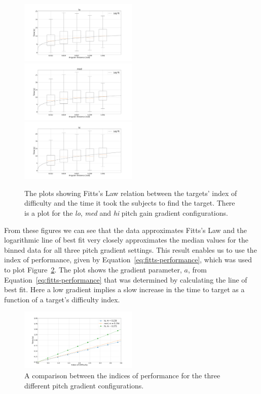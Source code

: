 \documentclass[format=sigconf, review=true, screen=true, anonymous=true]{acmart}
\begin{document}
\begin{figure}
  \centering
  \includegraphics[width=0.5\textwidth]{figures/fitts_lo.png}
  \includegraphics[width=0.5\textwidth]{figures/fitts_med.png}
  \includegraphics[width=0.5\textwidth]{figures/fitts_hi.png}
  \caption{The plots showing Fitts's Law relation between the targets' index of difficulty and the time it took the subjects to find the target. There is a plot for the \emph{lo}, \emph{med} and \emph{hi} pitch gain gradient configurations.} 
  \label{fig:fitts}
\end{figure}

From these figures we can see that the data approximates Fitts's Law and the logarithmic line of best fit very closely approximates the median values for the binned data for all three pitch gradient settings. This result enables us to use the index of performance, given by Equation~\ref{eq:fitts-performance}, which was used to plot Figure~\ref{fig:fitts-performance}. The plot shows the gradient parameter, $a$, from Equation~\ref{eq:fitts-performance} that was determined by calculating the line of best fit. Here a low gradient implies a slow increase in the time to target as a function of a target's difficulty index. 

\begin{figure}
  \centering
  \includegraphics[width=0.5\textwidth]{figures/fitts_performance.png}
  \caption{A comparison between the indices of performance for the three different pitch gradient configurations.}
  \label{fig:fitts-performance}
\end{figure}
\end{document}

